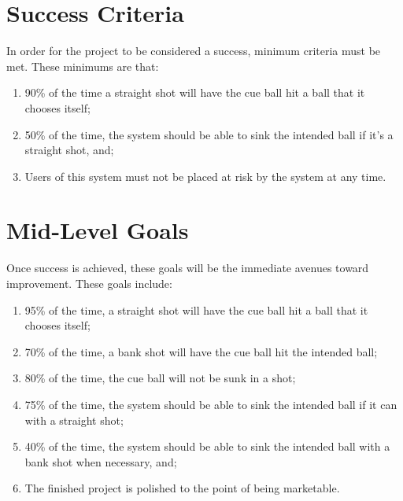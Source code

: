 \documentclass[titlepage]{article}
\begin{document}
\section{Success Criteria}
In order for the project to be considered a success, minimum criteria must be met. These minimums are that:
\begin{enumerate}
	\item 90\% of the time a straight shot will have the cue ball hit a ball that it chooses itself;
	\item 50\% of the time, the system should be able to sink the intended ball if it's a straight shot, and;
	\item Users of this system must not be placed at risk by the system at any time.
\end{enumerate}

\section{Mid-Level Goals}
Once success is achieved, these goals will be the immediate avenues toward improvement. These goals include:
\begin{enumerate}
	\item 95\% of the time, a straight shot will have the cue ball hit a ball that it chooses itself;
	\item 70\% of the time, a bank shot will have the cue ball hit the intended ball;
	\item 80\% of the time, the cue ball will not be sunk in a shot;
	\item 75\% of the time, the system should be able to sink the intended ball if it can with a straight shot;
	\item 40\% of the time, the system should be able to sink the intended ball with a bank shot when necessary, and;
	\item The finished project is polished to the point of being marketable.
\end{enumerate}
\end{document}
